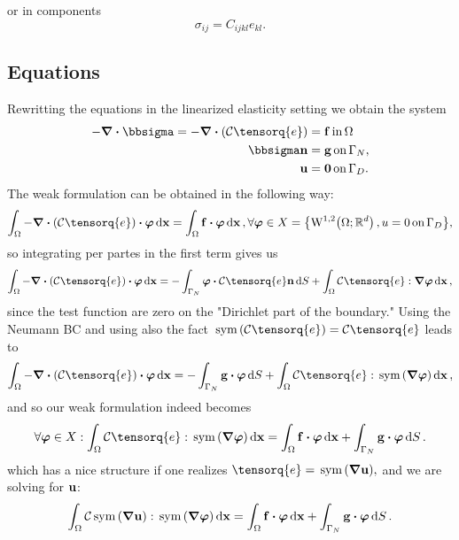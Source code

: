 \documentclass[11pt]{scrartcl} %
\begin{document}
or in components
\[
	\sigma_{ij}=C_{ijkl}e_{kl}.
\]

\subsection{Equations}
\label{sec:linel_equations}

Rewritting the equations in the linearized elasticity setting we obtain the system
\begin{align*}
	-\divergence{\bbsigma} = - \divergence{\qty(\mathcal{C}\tensorq{e})} &= \vb{f} \, \text{in} \, \Omega \\
	\bbsigma\vb{n} &= \vb{g} \, \text{on} \, \Gamma_{N}, \\
	\vb{u} &= \vb{0} \, \text{on} \, \Gamma_{D}.
\end{align*}
The weak formulation can be obtained in the following way:
\[
	\int_{\Omega} -\divergence{\qty(\mathcal{C}\tensorq{e})} \vdot \vb*{\varphi} \dd{\vb{x}} = \int_{\Omega}\vb{f}\vdot \vb*{\varphi}\dd{\vb{x}}, \forall \vb*{\varphi} \in X = \qty{\WkpSet[1][2]{\Omega;\R^d}, u=0 \, \text{on} \, \Gamma_D},
\]
so integrating per partes in the first term gives us
\[
	\int_{\Omega}- \divergence{\qty(\mathcal{C}\tensorq{e})} \vdot \vb*{\varphi}\dd{\vb{x}} = -\int_{\Gamma_N}\vb*{\varphi} \vdot \mathcal{C}\tensorq{e}\vb{n}\dd{S} + \int_{\Omega}\mathcal{C}\tensorq{e} : \grad \vb*{\varphi} \dd{\vb{x}},
\]
since the test function are zero on the "Dirichlet part of the boundary." Using the Neumann BC and using also the fact $\, \text{sym} \,\qty(\mathcal{C}\tensorq{e}) = \mathcal{C}\tensorq{e}$ leads to 
\[
	\int_{\Omega}- \divergence{\qty(\mathcal{C}\tensorq{e})} \vdot \vb*{\varphi}\dd{\vb{x}} = -\int_{\Gamma_N}\vb{g} \vdot \vb*{\varphi}\dd{S} + \int_{\Omega}\mathcal{C}\tensorq{e} : \, \text{sym} \,\qty(\grad \vb*{\varphi})\dd{\vb{x}},
\]
and so our weak formulation indeed becomes
\[
	\forall \vb*{\varphi} \in X: \int_{\Omega}\mathcal{C}\tensorq{e}: \, \text{sym} \,\qty(\grad \vb*{\varphi})\dd{\vb{x}} = \int_{\Omega}\vb{f} \vdot \vb*{\varphi}\dd{\vb{x}} + \int_{\Gamma_N}\vb{g} \vdot \vb*{\varphi}\dd{S}.
\]
which has a nice structure if one realizes $\tensorq{e} = \, \text{sym} \,\qty(\grad \vb{u}),$ and we are solving for $\vb{u}$:
\[
	\int_{\Omega}\mathcal{C}\, \text{sym} \,\qty(\grad \vb{u}): \, \text{sym} \,\qty(\grad \vb*{\varphi})\dd{\vb{x}} = \int_{\Omega}\vb{f} \vdot \vb*{\varphi}\dd{\vb{x}} + \int_{\Gamma_N}\vb{g} \vdot \vb*{\varphi}\dd{S}.
\]
\end{document}

